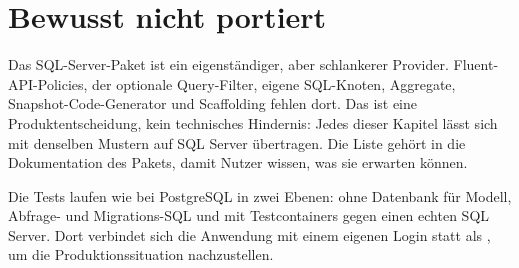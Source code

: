 \section{Bewusst nicht portiert}

Das SQL-Server-Paket ist ein eigenständiger, aber schlankerer Provider. Fluent-API-Policies,
der optionale Query-Filter, eigene SQL-Knoten, Aggregate, Snapshot-Code-Generator und
Scaffolding fehlen dort. Das ist eine Produktentscheidung, kein technisches Hindernis: Jedes
dieser Kapitel lässt sich mit denselben Mustern auf SQL Server übertragen. Die Liste gehört
in die Dokumentation des Pakets, damit Nutzer wissen, was sie erwarten können.


Die Tests laufen wie bei PostgreSQL in zwei Ebenen: ohne Datenbank für Modell, Abfrage- und
Migrations-SQL und mit Testcontainers gegen einen echten SQL Server. Dort verbindet sich die
Anwendung mit einem eigenen Login statt als , um die Produktionssituation
nachzustellen.
